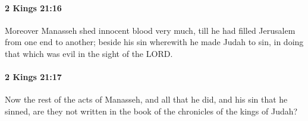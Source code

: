 		\paragraph{2 Kings 21:16} %
			\label{2KINGS-21-16}

			Moreover Manasseh shed innocent blood very much, till he had filled Jerusalem from one end to another; beside his sin wherewith he made Judah to sin, in doing that which was evil in the sight of the LORD.


		\paragraph{2 Kings 21:17} %
			\label{2KINGS-21-17}

			Now the rest of the acts of Manasseh, and all that he did, and his sin that he sinned, are they not written in the book of the chronicles of the kings of Judah?


